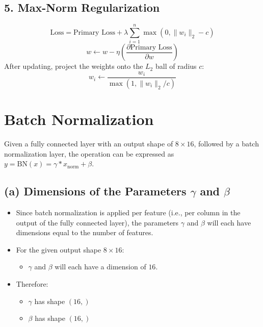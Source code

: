 \documentclass{article}
\begin{document}
\subsection*{5. Max-Norm Regularization}
\[
\text{Loss} = \text{Primary Loss} + \lambda \sum_{i=1}^{n} \max(0, \|w_i\|_2 - c)
\]
\[
w \leftarrow w - \eta \left( \frac{\partial \text{Primary Loss}}{\partial w} \right)
\]
After updating, project the weights onto the \(L_2\) ball of radius \(c\):
\[
w_i \leftarrow \frac{w_i}{\max(1, \|w_i\|_2 / c)}
\]













\section{Batch Normalization}

Given a fully connected layer with an output shape of $8 \times 16$, followed by a batch normalization layer, the operation can be expressed as $y = \text{BN}(x) = \gamma \ast x_{\text{norm}} + \beta$.

\subsection*{(a) Dimensions of the Parameters $\gamma$ and $\beta$}

\begin{itemize}
    \item Since batch normalization is applied per feature (i.e., per column in the output of the fully connected layer), the parameters $\gamma$ and $\beta$ will each have dimensions equal to the number of features.
    \item For the given output shape $8 \times 16$:
    \begin{itemize}
        \item $\gamma$ and $\beta$ will each have a dimension of $16$.
    \end{itemize}
    \item Therefore:
    \begin{itemize}
        \item $\gamma$ has shape $(16,)$
        \item $\beta$ has shape $(16,)$
    \end{itemize}
\end{itemize}
\end{document}
